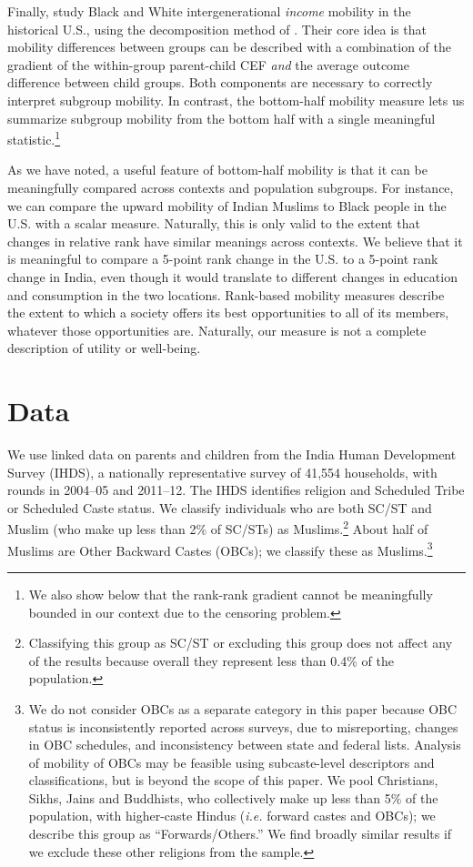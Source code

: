 \documentclass[12pt,letterpaper]{article}
\numberwithin{equation}{section}
\begin{document}
Finally,  study Black and White intergenerational \textit{income} mobility in the historical U.S., using the decomposition method of . Their core idea is that mobility differences between groups can be described with a combination of the gradient of the within-group parent-child CEF \textit{and} the average outcome difference between child groups. Both components are necessary to correctly interpret subgroup mobility. In contrast, the bottom-half mobility measure lets us summarize subgroup mobility from the bottom half with a single meaningful statistic.\footnote{We also show below that the rank-rank gradient cannot be meaningfully bounded in our context due to the censoring problem.}

As we have noted, a useful feature of bottom-half mobility is that it can be meaningfully compared across contexts and population subgroups. For instance, we can compare the upward mobility of Indian Muslims to Black people in the U.S. with a scalar measure. Naturally, this is only valid to the extent that changes in relative rank have similar meanings across contexts. We believe that it is meaningful to compare a 5-point rank change in the U.S. to a 5-point rank change in India, even though it would translate to different changes in education and consumption in the two locations. Rank-based mobility measures describe the extent to which a society offers its best opportunities to all of its members, whatever those opportunities are. Naturally, our measure is not a complete description of utility or well-being. 

\section{Data}
\label{sec:data} 

We use linked data on parents and children from the India Human Development Survey (IHDS), a nationally representative survey of 41,554 households, with rounds in 2004--05 and 2011--12.  The IHDS identifies religion and Scheduled Tribe or Scheduled Caste status. We classify individuals who are both SC/ST and Muslim (who make up less than 2\% of SC/STs) as Muslims.\footnote{Classifying this group as SC/ST or excluding this group does not affect any of the results because overall they represent less than 0.4\% of the population.} About half of Muslims are Other Backward Castes (OBCs); we classify these as Muslims.\footnote{We do not consider OBCs as a separate category in this paper because OBC status is inconsistently reported across surveys, due to misreporting, changes in OBC schedules, and inconsistency between state and federal lists. Analysis of mobility of OBCs may be feasible using subcaste-level descriptors and classifications, but is beyond the scope of this paper. We pool Christians, Sikhs, Jains and Buddhists, who collectively make up less than 5\% of the population, with higher-caste Hindus (\textit{i.e.} forward castes and OBCs); we describe this group as ``Forwards/Others.'' We find broadly similar results if we exclude these other religions from the sample.}
\end{document}
